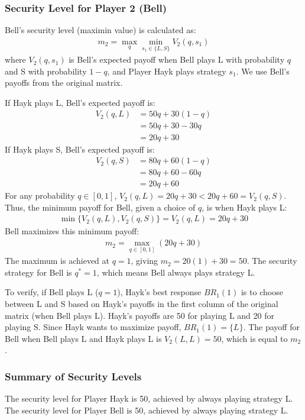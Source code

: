 \documentclass{article}
\begin{document}
\subsubsection*{Security Level for Player 2 (Bell)}
Bell's security level (maximin value) is calculated as:
\begin{align*} m_2 = \max_q \min_{s_1 \in \{L, S\}} V_2(q, s_1) \end{align*}
where $V_2(q, s_1)$ is Bell's expected payoff when Bell plays L with probability $q$ and S with probability $1-q$, and Player Hayk plays strategy $s_1$. We use Bell's payoffs from the original matrix.

If Hayk plays L, Bell's expected payoff is:
\begin{align*} V_2(q, L) &= 50q + 30(1-q) \\ &= 50q + 30 - 30q \\ &= 20q + 30 \end{align*}
If Hayk plays S, Bell's expected payoff is:
\begin{align*} V_2(q, S) &= 80q + 60(1-q) \\ &= 80q + 60 - 60q \\ &= 20q + 60 \end{align*}
For any probability $q \in [0, 1]$, $V_2(q, L) = 20q + 30 < 20q + 60 = V_2(q, S)$. Thus, the minimum payoff for Bell, given a choice of $q$, is when Hayk plays L:
\begin{align*} \min \{ V_2(q, L), V_2(q, S) \} = V_2(q, L) = 20q + 30 \end{align*}
Bell maximizes this minimum payoff:
\begin{align*} m_2 = \max_{q \in [0, 1]} (20q + 30) \end{align*}
The maximum is achieved at $q=1$, giving $m_2 = 20(1) + 30 = 50$.
The security strategy for Bell is $q^*=1$, which means Bell always plays strategy L.

To verify, if Bell plays L ($q=1$), Hayk's best response $BR_1(1)$ is to choose between L and S based on Hayk's payoffs in the first column of the original matrix (when Bell plays L). Hayk's payoffs are 50 for playing L and 20 for playing S. Since Hayk wants to maximize payoff, $BR_1(1) = \{L\}$.
The payoff for Bell when Bell plays L and Hayk plays L is $V_2(L,L) = 50$, which is equal to $m_2$.

\subsubsection*{Summary of Security Levels}
The security level for Player Hayk is 50, achieved by always playing strategy L. The security level for Player Bell is 50, achieved by always playing strategy L.
\end{document}
